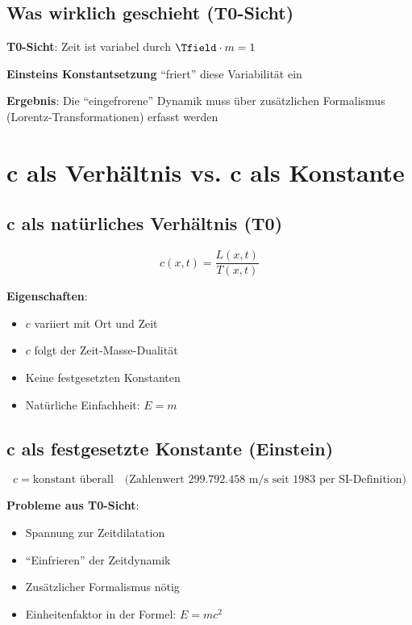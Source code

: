 	\subsection{Was wirklich geschieht (T0-Sicht)}
	
	\textbf{T0-Sicht}: Zeit ist variabel durch $\Tfield \cdot m = 1$
	
	\textbf{Einsteins Konstantsetzung} ``friert'' diese Variabilität ein
	
	\textbf{Ergebnis}: Die ``eingefrorene'' Dynamik muss über zusätzlichen Formalismus (Lorentz-Transformationen) erfasst werden
	
	\section{c als Verhältnis vs. c als Konstante}
	
	\subsection{c als natürliches Verhältnis (T0)}
	
	\begin{equation}
		c(x,t) = \frac{L(x,t)}{T(x,t)}
	\end{equation}
	
	\textbf{Eigenschaften}:
	\begin{itemize}
		\item $c$ variiert mit Ort und Zeit
		\item $c$ folgt der Zeit-Masse-Dualität
		\item Keine festgesetzten Konstanten
		\item Natürliche Einfachheit: $E = m$
	\end{itemize}
	
	\subsection{c als festgesetzte Konstante (Einstein)}
	
	\begin{equation}
		c = \text{konstant überall} \quad \text{(Zahlenwert 299.792.458 m/s seit 1983 per SI-Definition)}
	\end{equation}
	
	\textbf{Probleme aus T0-Sicht}:
	\begin{itemize}
		\item Spannung zur Zeitdilatation
		\item ``Einfrieren'' der Zeitdynamik
		\item Zusätzlicher Formalismus nötig
		\item Einheitenfaktor in der Formel: $E = mc^2$
	\end{itemize}
	
